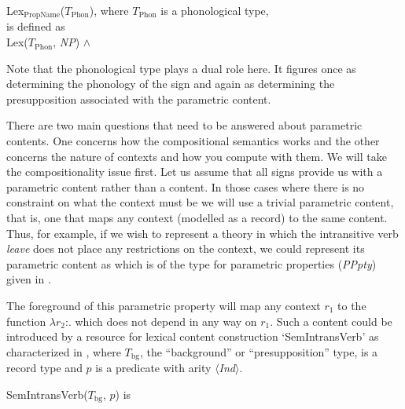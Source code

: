 \begin{ex} 
Lex$_{\mathrm{PropName}}$($T_{\mathrm{Phon}}$), where
$T_{\mathrm{Phon}}$ is a phonological type,
\\
is defined as \\
Lex($T_{\mathrm{Phon}}$, \textit{NP}) \d{$\wedge$}
\end{ex} 
Note that the phonological type plays a dual role here.  It figures
once as determining the phonology of the sign and again as determining
the presupposition associated with the parametric content.   
  

There are two main questions that need to be answered about parametric
contents.  One concerns how the compositional semantics works and the
other concerns the nature of contexts and how you compute with them.
We will take the compositionality issue first.  Let us assume that all
signs provide us with a parametric content rather than a content.  In
those cases where there is no constraint on what the context must be
we will use a trivial parametric content, that is, one that maps any
context (modelled as a record) to the same content.  Thus, for
example, if we wish to represent a theory in which the intransitive
verb \textit{leave} does not place any restrictions on the context, we
could represent its parametric content as  which is of the
type for parametric properties (\textit{PPpty}) given in .
\begin{ex}
\begin{subex}
\item {}

\item {}
\end{subex}
\label{ex:parametricLeave}

\end{ex}
The foreground of this parametric property will map any context $r_1$ to the function $\lambda r_2$:.
 which does not depend in
any way on $r_1$. Such a content could be introduced by a resource for
lexical content construction `SemIntransVerb' as characterized in
\nexteg{}, where $T_{\mathrm{bg}}$, the
``background'' or ``presupposition'' type, is a record type and $p$ is a predicate with arity $\langle$\textit{Ind}$\rangle$.
\begin{ex} 
SemIntransVerb($T_{\mathrm{bg}}$, $p$) is \\ 
\end{ex}


